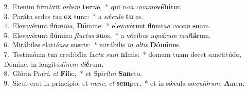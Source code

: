 {2.~}Etenim firmávit \textit{or}\textit{bem} \textbf{ter}ræ,~* qui \textit{non} \textit{com}\textit{mo}\textbf{vé}\textbf{bi}tur.\\
{3.~}Paráta sedes \textit{tu}\textit{a} \textbf{ex} tunc:~* a \textit{sǽ}\textit{cu}\textit{lo} \textbf{tu} es.\\
{4.~}Elevavérunt flú\textit{mi}\textit{na}, \textbf{Dó}mine:~* elevavérunt flúmi\textit{na} \textit{vo}\textit{cem} \textbf{su}am.\\
{5.~}Elevavérunt flúmina \textit{flu}\textit{ctus} \textbf{su}os,~* a vócibus a\textit{quá}\textit{rum} \textit{mul}\textbf{tá}rum.\\
{6.~}Mirábiles elati\textit{ó}\textit{nes} \textbf{ma}ris:~* mirábilis \textit{in} \textit{al}\textit{tis} \textbf{Dó}\textbf{mi}nus.\\
{7.~}Testimónia tua credibília fa\textit{cta} \textit{sunt} \textbf{ni}mis:~* domum tuam decet sanctitúdo, Dómine, in longitú\textit{di}\textit{nem} \textit{di}\textbf{é}rum.\\
{8.~}Glória Pa\textit{tri}, \textit{et} \textbf{Fí}lio,~* et Spi\textit{rí}\textit{tu}\textit{i} \textbf{San}cto.\\
{9.~}Sicut erat in princípio, et \textit{nunc}, \textit{et} \textbf{sem}per,~* et in sǽcula sæ\textit{cu}\textit{ló}\textit{rum}. \textbf{A}men.\\
